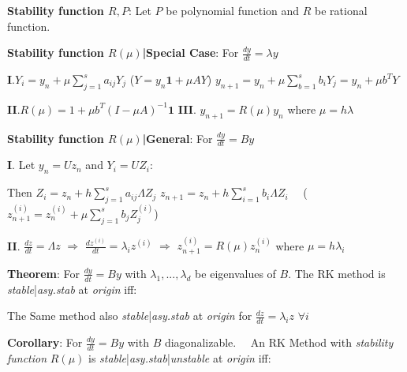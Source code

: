\documentclass[9pt]{article}
\begin{document}
\textbf{Stability function $R,P$}: Let $P$ be polynomial function and $R$ be rational function.


\textbf{Stability function $R(\mu)$|Special Case}: For $\frac{dy}{dt}=\lambda y$  

\quad \textbf{I}.$Y_i=y_n+\mu\sum^s_{j=1}a_{ij}Y_j$ \quad ($Y=y_n\mathbf{1}+\mu AY$) \qquad $y_{n+1}=y_n+\mu\sum^s_{b=1}b_iY_j=y_n+\mu b^TY$

\quad \textbf{II}.$R(\mu)=1+\mu b^T(I-\mu A)^{-1}\mathbf{1}$ \hspace{80pt} \textbf{III}. $y_{n+1}=R(\mu)y_n$ \qquad where $\mu=h\lambda$

\textbf{Stability function $R(\mu)$|General}: For $\frac{dy}{dt}=By$  

\quad \textbf{I}. Let $y_n=U z_n$ and $Y_i=UZ_i$:

\qquad Then $Z_{i}=z_n+h\sum_{j=1}^{s}a_{ij}\Lambda Z_j$  \qquad $z_{n+1}=z_n+h\sum_{i=1}^{s}b_i\Lambda Z_i$ \ \ {\footnotesize ($z_{n+1}^{(i)}=z_{n}^{(i)}+\mu\sum^s_{j=1}b_jZ_j^{(i)}$)}

\quad \textbf{II}. $\frac{dz}{dt}=\Lambda z$ \quad $\Rightarrow$ \quad $\frac{dz^{(i)}}{dt}=\lambda_i z^{(i)}$ \quad $\Rightarrow$ \quad $z_{n+1}^{(i)} = R(\mu)z_n^{(i)}$ \quad where $\mu=h\lambda_i$ 

\textbf{Theorem}: For $\frac{dy}{dt}=By$ with $\lambda_1,...,\lambda_d$ be eigenvalues of $B$. The RK method is \textit{stable}|\textit{asy.stab} at \textit{origin} iff:

\quad The Same method also \textit{stable}|\textit{asy.stab} at \textit{origin} for $\frac{dz}{dt}=\lambda_iz$ $\forall i$

\textbf{Corollary}: {\small For $\frac{dy}{dt}=By$ with $B$ diagonalizable. \ \ An RK Method with \textit{stability function} $R(\mu)$ is \textit{stable}|\textit{asy.stab}|\textit{unstable} at \textit{origin} iff: }
\end{document}
